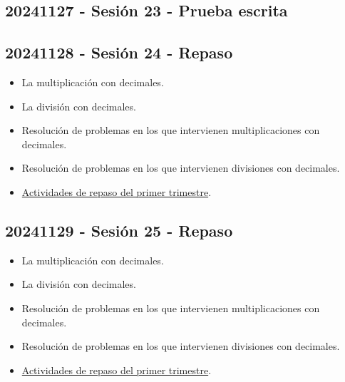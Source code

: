 \documentclass[a4paper,12pt]{article}
\begin{document}
\subsection{20241127 - Sesión 23 - Prueba escrita}

\subsection{20241128 - Sesión 24 - Repaso}

\begin{itemize}
    \item La multiplicación con decimales.
    \item La división con decimales.
    \item Resolución de problemas en los que intervienen multiplicaciones con decimales.
    \item Resolución de problemas en los que intervienen divisiones con decimales.
    \item \href{RepasoT1.pdf}{Actividades de repaso del primer trimestre}.
\end{itemize}

\subsection{20241129 - Sesión 25 - Repaso}

\begin{itemize}
    \item La multiplicación con decimales.
    \item La división con decimales.
    \item Resolución de problemas en los que intervienen multiplicaciones con decimales.
    \item Resolución de problemas en los que intervienen divisiones con decimales.
    \item \href{RepasoT1.pdf}{Actividades de repaso del primer trimestre}.
\end{itemize}
\end{document}
